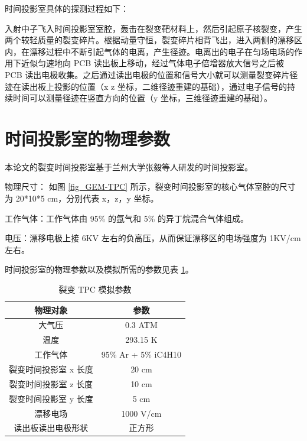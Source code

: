 \documentclass[AutoFakeBold]{LZUThesis}
\begin{document}

时间投影室具体的探测过程如下：

入射中子飞入时间投影室室腔，轰击在裂变靶材料上，然后引起原子核裂变，产生两个较轻质量的裂变碎片。根据动量守恒，裂变碎片相背飞出，进入两侧的漂移区内，在漂移过程中不断引起气体的电离，产生径迹。电离出的电子在匀场电场的作用下近似匀速地向 PCB 读出板上移动，经过气体电子倍增器放大信号之后被 PCB 读出电极收集。之后通过读出电极的位置和信号大小就可以测量裂变碎片径迹在读出板上投影的位置（x z 坐标，二维径迹重建的基础），通过电子信号的持续时间可以测量径迹在竖直方向的位置（y 坐标，三维径迹重建的基础）\cite{魏康2019基于GEM工艺的裂变时间投影室中裂变碎片的讨论}。





\section{时间投影室的物理参数}
本论文的裂变时间投影室基于兰州大学张毅等人研发的时间投影室\cite{魏康2019基于GEM工艺的裂变时间投影室中裂变碎片的讨论}。

物理尺寸：
如图 \ref{fig_GEM-TPC} 所示，裂变时间投影室的核心气体室腔的尺寸为 20*10*5 cm，分别代表 x，z，y 坐标。

工作气体：工作气体由 95\% 的氩气和 5\% 的异丁烷混合气体组成\cite{魏康2019基于GEM工艺的裂变时间投影室中裂变碎片的讨论}。

电压：漂移电极上接 6KV 左右的负高压，从而保证漂移区的电场强度为 1KV/cm 左右。

时间投影室的物理参数以及模拟所需的参数见表 \ref{tbl_TPC_parameters}。

\begin{table}[H]
    \centering
    \caption{裂变 TPC 模拟参数}
    \begin{tabular}{cc} %
    \toprule
    物理对象& 参数 \\
    \midrule
    大气压 & 0.3 ATM \\
    温度 & 293.15 K \\
    工作气体 & 95\% Ar + 5\% iC4H10 \\
    裂变时间投影室 x 长度 & 20 cm \\
    裂变时间投影室 z 长度 & 10 cm \\
    裂变时间投影室 y 长度 & 5 cm \\
    漂移电场 & 1000 V/cm \\
    读出板读出电极形状 & 正方形 \\
    \bottomrule
    \end{tabular}
    \label{tbl_TPC_parameters}
\end{table}
\end{document}
